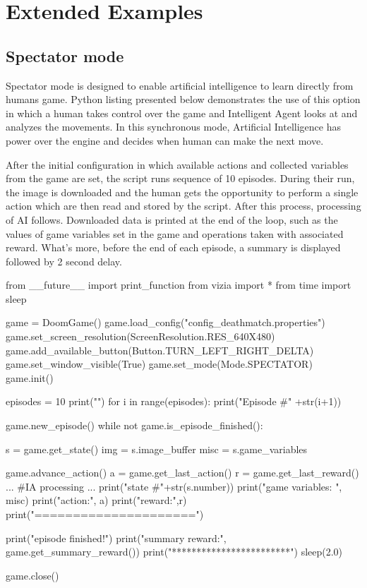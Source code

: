 \section{Extended Examples}
\subsection{Spectator mode}
Spectator mode is designed to enable artificial intelligence to learn directly from humans game.
Python listing presented below demonstrates the use of this option in which a human takes control over the game and Intelligent Agent looks at and analyzes the movements. In this synchronous mode, Artificial Intelligence has power over the engine and decides when human can make the next move. 


After the initial configuration in which available actions and collected variables from the game are set, the script runs sequence of 10 episodes. During their run, the image is downloaded and the human gets the opportunity to perform a single action which are then read and stored by the script. After this process, processing of AI follows. Downloaded data is printed at the end of the loop, such as the values of game variables set in the game and operations taken with associated reward. What's more, before the end of each episode, a summary is displayed followed by 2 second delay.

\begin{pblock}
from __future__ import print_function
from vizia import *
from time import sleep

game = DoomGame()
game.load_config("config_deathmatch.properties")
game.set_screen_resolution(ScreenResolution.RES_640X480)
game.add_available_button(Button.TURN_LEFT_RIGHT_DELTA)
game.set_window_visible(True)
game.set_mode(Mode.SPECTATOR)
game.init()

episodes = 10
print("")
for i in range(episodes):
	print("Episode #" +str(i+1))
	
	game.new_episode()
	while not game.is_episode_finished():
		
		s = game.get_state()
		img = s.image_buffer
		misc = s.game_variables

		game.advance_action()
		a = game.get_last_action()
		r = game.get_last_reward()
		...		
		#IA processing
		...
		print("state #"+str(s.number))
		print("game variables: ", misc)
		print("action:", a)
		print("reward:",r)
		print("=====================")

	
	print("episode finished!")
	print("summary reward:", game.get_summary_reward())
	print("************************")
	sleep(2.0)

game.close()
\end{pblock}

